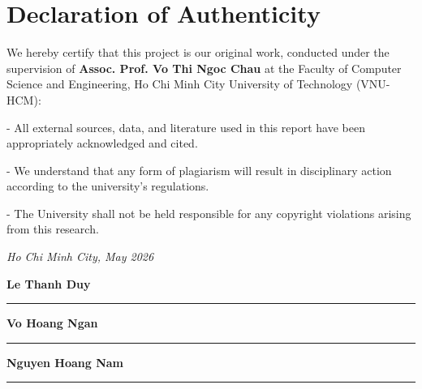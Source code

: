 \section*{Declaration of Authenticity}
\vspace{0.5cm}

We hereby certify that this project is our original work, conducted under the supervision of \textbf{Assoc. Prof. Vo Thi Ngoc Chau} at the Faculty of Computer Science and Engineering, Ho Chi Minh City University of Technology (VNU-HCM):

- All external sources, data, and literature used in this report have been appropriately acknowledged and cited.

- We understand that any form of plagiarism will result in disciplinary action according to the university's regulations.

- The University shall not be held responsible for any copyright violations arising from this research.

\vspace{1.5cm}

\begin{flushright}
    \textit{Ho Chi Minh City, May 2026}
\end{flushright}

\vspace{0.5cm}

\begin{minipage}[t]{0.33\textwidth}
    \centering
    \textbf{Le Thanh Duy} \\
    \vspace{1.5cm}
    \rule{3cm}{0.4pt}
\end{minipage}
\begin{minipage}[t]{0.33\textwidth}
    \centering
    \textbf{Vo Hoang Ngan} \\
    \vspace{1.5cm}
    \rule{3cm}{0.4pt}
\end{minipage}
\begin{minipage}[t]{0.33\textwidth}
    \centering
    \textbf{Nguyen Hoang Nam} \\
    \vspace{1.5cm}
    \rule{3cm}{0.4pt}
\end{minipage}
\clearpage
